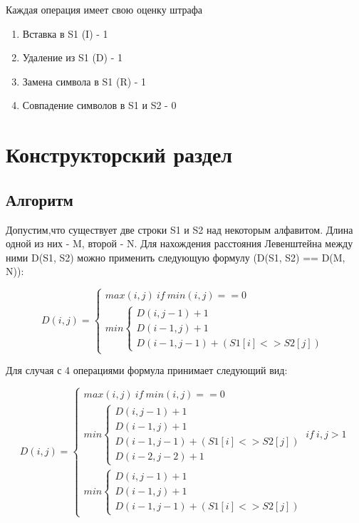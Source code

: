 \documentclass[a4paper, 14pt]{article}
\begin{document}
	Каждая операция имеет свою оценку штрафа
	
	\begin{enumerate}
		\item Вставка в S1 (I) - 1
		\item Удаление из S1 (D) - 1
		\item Замена символа в S1 (R) - 1
		\item Совпадение символов в S1 и S2 - 0
	\end{enumerate}
	
	\newpage
	\section{Конструкторский раздел}
		
	\subsection{Алгоритм}

	Допустим,что существует две строки S1 и S2 над некоторым алфавитом. Длина одной из них - M, второй - N. Для нахождения расстояния Левенштейна между ними D(S1, S2) можно применить следующую формулу (D(S1, S2) == D(M, N))\cite{web1}:
	
	\[
	D(i,j)=\begin{cases}
	max(i,j)\ if\ min(i,j) == 0\\
	min\begin{cases}
	D(i,j-1) + 1\\
	D(i-1,j) + 1\\
	D(i-1,j-1) + (S1[i] <> S2[j])
	\end{cases}
	\end{cases}
	\]
	
	Для случая с 4 операциями формула принимает следующий вид\cite{web2}:
	
	\[
	D(i,j)=\begin{cases}
	max(i,j)\ if\ min(i,j) == 0\\
	min\begin{cases}
	D(i,j-1) + 1\\
	D(i-1,j) + 1\\
	D(i-1,j-1) + (S1[i] <> S2[j])\\
	D(i-2,j-2) + 1
	\end{cases} \ if \ i,j>1\\
	min\begin{cases}
	D(i,j-1) + 1\\
	D(i-1,j) + 1\\
	D(i-1,j-1) + (S1[i] <> S2[j])
	\end{cases}
	\end{cases}
	\]
	
\end{document}

